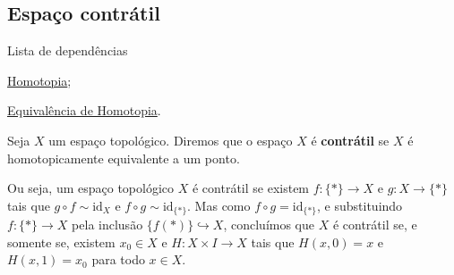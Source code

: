\subsection{Espaço contrátil}
\label{espaco-contratil-def}
\begin{titlemize}{Lista de dependências}
	\item \hyperref[homotopia-def]{Homotopia};\\
        \item \hyperref[equiv-homotopia]{Equivalência de Homotopia}.
\end{titlemize}

\begin{defi}
	Seja $X$ um espaço topológico. Diremos que o espaço $X$ é \textbf{contrátil} se $X$ é homotopicamente equivalente a um ponto.
\end{defi}

Ou seja, um espaço topológico $X$ é contrátil se existem $f:\{*\} \to X$ e $g: X\to \{*\}$ tais que $g\circ f \sim \text{id}_X$ e $f\circ g \sim \text{id}_{\{*\}}$. Mas como $f\circ g = \text{id}_{\{*\}}$, e substituindo $f:\{*\} \to X$ pela inclusão $\{f(*)\} \hookrightarrow X$, concluímos que $X$ é contrátil se, e somente se, existem $x_0\in X$ e $H: X\times I\to X$ tais que $H(x,0)=x$ e $H(x,1) = x_0$ para todo $x \in X$.

